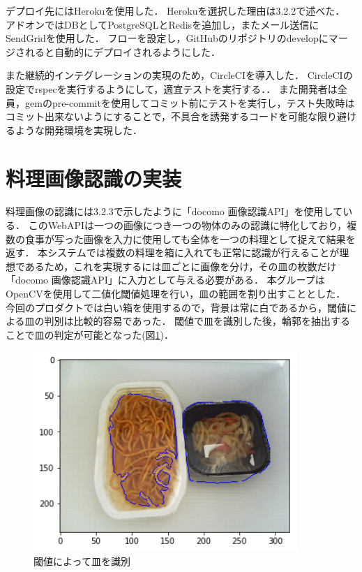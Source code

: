 \documentclass[../report]{subfiles}
\begin{document}
デプロイ先にはHerokuを使用した．
Herokuを選択した理由は3.2.2で述べた．
アドオンではDBとしてPostgreSQLとRedisを追加し，またメール送信にSendGridを使用した．
フローを設定し，GitHubのリポジトリのdevelopにマージされると自動的にデプロイされるようにした．

また継続的インテグレーションの実現のため，CircleCIを導入した．
CircleCIの設定でrspecを実行するようにして，適宜テストを実行する．．
また開発者は全員，gemのpre-commitを使用してコミット前にテストを実行し，テスト失敗時はコミット出来ないようにすることで，不具合を誘発するコードを可能な限り避けるような開発環境を実現した．


\section{料理画像認識の実装}
料理画像の認識には3.2.3で示したように「docomo 画像認識API」を使用している．
このWebAPIは一つの画像につき一つの物体のみの認識に特化しており，複数の食事が写った画像を入力に使用しても全体を一つの料理として捉えて結果を返す．
本システムでは複数の料理を箱に入れても正常に認識が行えることが理想であるため，これを実現するには皿ごとに画像を分け，その皿の枚数だけ「docomo 画像認識API」に入力として与える必要がある．
本グループはOpenCVを使用して二値化閾値処理を行い，皿の範囲を割り出すこととした．
今回のプロダクトでは白い箱を使用するので，背景は常に白であるから，閾値による皿の判別は比較的容易であった．
閾値で皿を識別した後，輪郭を抽出することで皿の判定が可能となった(図\ref{fig:6-threshold})．

\begin{figure}[htbp]
    \begin{center}
        \includegraphics[width=10cm]{imgs/6_threshold.png}
        \caption{閾値によって皿を識別}
        \label{fig:6-threshold}
    \end{center}
\end{figure}
\end{document}
